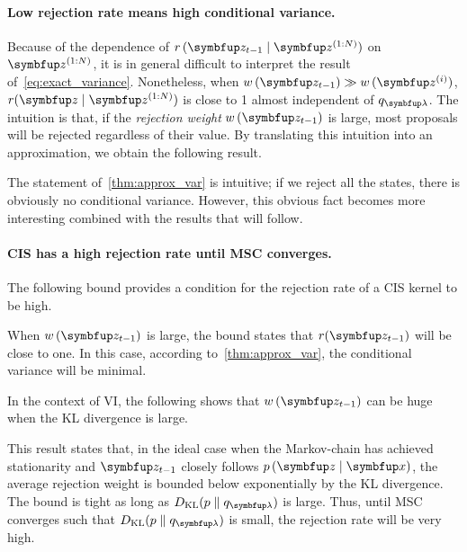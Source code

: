 \paragraph{Low rejection rate means high conditional variance.}
Because of the dependence of \(r\,(\vz_{t-1}\mid\vz^{(1:N)})\) on \(\vz^{(1:N)}\), it is in general difficult to interpret the result of~\eqref{eq:exact_variance}.
Nonetheless, when \(w\,(\vz_{t-1}) \gg w\,(\vz^{(i)})\), \(r(\vz\mid\vz^{(1:N)})\) is close to 1 almost independent of \(q_{\vlambda}\).
The intuition is that, if the \textit{rejection weight} \(w\,(\vz_{t-1})\) is large, most proposals will be rejected regardless of their value.
By translating this intuition into an approximation, we obtain the following result.
%

%
The statement of~\cref{thm:approx_var} is intuitive; if we reject all the states, there is obviously no conditional variance.
However, this obvious fact becomes more interesting combined with the results that will follow.

\vspace{-0.1in}
\paragraph{CIS has a high rejection rate until MSC converges.}
The following bound provides a condition for the rejection rate of a CIS kernel to be high.
%

%
When \(w\,(\vz_{t-1})\) is large, the bound states that \(r(\vz_{t-1})\) will be close to one.
In this case, according to~\cref{thm:approx_var}, the conditional variance will be minimal.

In the context of VI, the following shows that \(w\,(\vz_{t-1})\) can be huge when the KL divergence is large.
%

%
This result states that, in the ideal case when the Markov-chain has achieved stationarity and \(\vz_{t-1}\) closely follows \(p\,(\vz\mid\vx)\), the average rejection weight is bounded below exponentially by the KL divergence.
The bound is tight as long as \(\DKL{p}{q_{\vlambda}}\) is large.
Thus, until MSC converges such that \(\DKL{p}{q_{\vlambda}}\) is small, the rejection rate will be very high.

